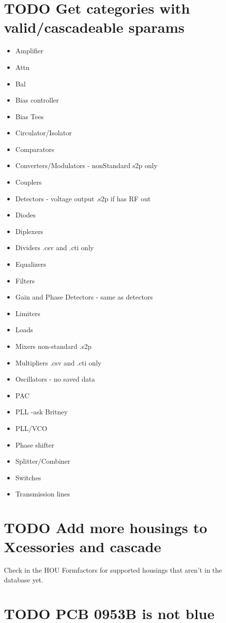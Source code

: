 \documentclass[11pt]{article}
\begin{document}
\section{{\bfseries\sffamily TODO}  Get categories with valid/cascadeable sparams}
\label{sec:org114eda1}
\begin{itemize}
\item Amplifier
\item Attn
\item Bal
\item Bias controller
\item Bias Tees
\item Circulator/Isolator
\item Comparators
\item Converters/Modulators - nonStandard s2p only
\item Couplers
\item Detectors - voltage output .s2p if has RF out
\item Diodes
\item Diplexers
\item Dividers .csv and .cti only
\item Equalizers
\item Filters
\item Gain and Phase Detectors - same as detectors
\item Limiters
\item Loads
\item Mixers non-standard .s2p
\item Multipliers .csv and .cti only
\item Oscillators - no saved data
\item PAC
\item PLL -ask Britney
\item PLL/VCO
\item Phase shifter
\item Splitter/Combiner
\item Switches
\item Transmission lines
\end{itemize}
\section{{\bfseries\sffamily TODO}  Add more housings to Xcessories and cascade}
\label{sec:orgee85306}
Check in the HOU Formfactors for supported housings that aren't in the database yet.  
\section{{\bfseries\sffamily TODO}  PCB 0953B is not blue}
\label{sec:org4cd3efe}
\end{document}
